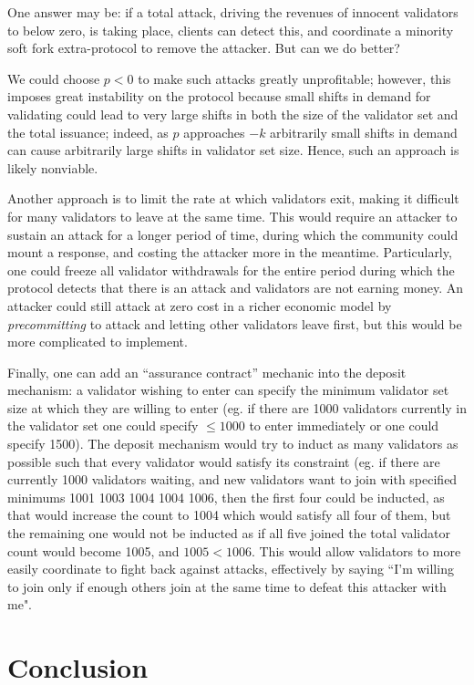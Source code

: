 \documentclass[12pt]{article}
\begin{document}
One answer may be: if a total attack, driving the revenues of innocent validators to below zero, is taking place, clients can detect this, and coordinate a minority soft fork extra-protocol to remove the attacker. But can we do better?

We could choose $p < 0$ to make such attacks greatly unprofitable; however, this imposes great instability on the protocol because small shifts in demand for validating could lead to very large shifts in both the size of the validator set and the total issuance; indeed, as $p$ approaches $-k$ arbitrarily small shifts in demand can cause arbitrarily large shifts in validator set size. Hence, such an approach is likely nonviable.

Another approach is to limit the rate at which validators exit, making it difficult for many validators to leave at the same time. This would require an attacker to sustain an attack for a longer period of time, during which the community could mount a response, and costing the attacker more in the meantime. Particularly, one could freeze all validator withdrawals for the entire period during which the protocol detects that there is an attack and validators are not earning money. An attacker could still attack at zero cost in a richer economic model by \emph{precommitting} to attack and letting other validators leave first, but this would be more complicated to implement.

Finally, one can add an ``assurance contract'' mechanic into the deposit mechanism: a validator wishing to enter can specify the minimum validator set size at which they are willing to enter (eg. if there are 1000 validators currently in the validator set one could specify $\le 1000$ to enter immediately or one could specify 1500). The deposit mechanism would try to induct as many validators as possible such that every validator would satisfy its constraint (eg. if there are currently 1000 validators waiting, and new validators want to join with specified minimums 1001 1003 1004 1004 1006, then the first four could be inducted, as that would increase the count to 1004 which would satisfy all four of them, but the remaining one would not be inducted as if all five joined the total validator count would become 1005, and $1005 < 1006$. This would allow validators to more easily coordinate to fight back against attacks, effectively by saying ``I'm willing to join only if enough others join at the same time to defeat this attacker with me".

\section{Conclusion}
\end{document}
